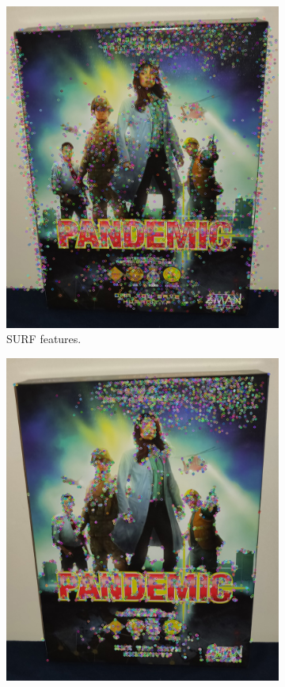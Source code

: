 \documentclass{l4proj}
\begin{document}
\begin{figure}[ht]
  \begin{subfigure}[b]{0.49\textwidth}
    \includegraphics[width=\textwidth]{l4template-master/images/surf_keypoints_example.jpg}
    \caption{SURF features.}
    \label{surffeatures}
  \end{subfigure}
  \begin{subfigure}[b]{0.49\textwidth}
    \includegraphics[width=\textwidth]{l4template-master/images/orb_keypoints_example.jpg}

\end{subfigure}
\end{figure}
\end{document}
